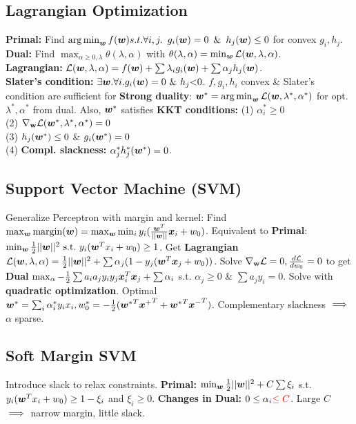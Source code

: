 \subsection*{Lagrangian Optimization}
\textbf{Primal:} Find $\operatorname*{arg\,min}_{\bm{w}} f({\bm{w}})\\s.t. \forall i,j.\,\,\,g_i({\bm{w}})=0\,\,\,\&\,\,\,h_j({\bm{w}}) \leq 0$ for convex $g_i, h_j$.\\
\textbf{Dual:} Find $\max_{\alpha\geq0,\lambda} {\theta(\lambda, \alpha)}$ with ${\theta(\lambda, \alpha)} = \min_{\bm{w}}\mathcal{L}({\bm{w}}, \lambda, \alpha)$.\\
\textbf{Lagrangian:} $\mathcal{L}({\bm{w}}, \mathbf{\lambda}, \mathbf{\alpha}) = f({\bm{w}}) + \sum\lambda_i g_i({\bm{w}}) + \sum\alpha_j h_j({\bm{w}})$.\\
\textbf{Slater's condition:} $\exists {\bm{w}}. \forall i. g_i({\bm{w}})=0\,\,\&\,\,h_j\mathbf{<}0$.
$f, g_i, h_i$ convex \& Slater's condition are sufficient for \textbf{Strong duality}: ${\bm{w}}^* = \operatorname*{arg\,min}_{\bm{w}} \mathcal{L}({\bm{w}}, \lambda^*, \alpha^*)$ for opt. $\lambda^*, \alpha^*$ from dual. Also, ${\bm{w}}^*$ satisfies \textbf{KKT conditions:} (1) $\alpha^*_i \geq 0$\\
(2) $\nabla_{\mathbf{w}}\mathcal{L}({\bm{w}}^*,\lambda^*,\alpha^*)=0$\\
(3) $h_j({\bm{w}}^*) \leq 0$ \& $g_i({\bm{w}}^*) = 0$\\
(4) \textbf{Compl. slackness:} $\alpha^*_jh^*_j({\bm{w}}^*) = 0$.

\subsection*{Support Vector Machine (SVM)}
Generalize Perceptron with margin and kernel:
Find $\max_{\bm{w}} \mathrm{margin}({\bm{w}}) = \max_{\bm{w}}\min_i y_i(\frac{{\bm{w}}^T}{||{\bm{w}}||}{\bm{x}}_i + w_0)$. Equivalent to \textbf{Primal}: $\min_{\bm{w}} \frac{1}{2}||{\bm{w}}||^2\,\,\mathrm{s.t.}\,\, y_i({\bm{w}}^Tx_i+w_0) \geq 1$. Get \textbf{Lagrangian} $\mathcal{L}({\bm{w}}, \lambda, \alpha) = \frac{1}{2}||{\bm{w}}||^2 + \sum\alpha_j (1-y_j({\bm{w}}^T{\bm{x}}_j+w_0))$. Solve $\nabla_{\mathbf{w}}\mathcal{L}=0, \frac{d\mathcal{L}}{dw_0}=0$ to get \textbf{Dual} $\max_\alpha -\frac{1}{2}\sum a_ia_jy_iy_j{\bm{x}}^T_i{\bm{x}}_j + \sum\alpha_i$ s.t.
$\alpha_j\geq 0$ \& $\sum a_jy_i = 0$. Solve with \textbf{quadratic optimization}. Optimal ${\bm{w}}^* = \sum_i \alpha^*_i y_i x_i, w_0^* = -\frac{1}{2}({{\bm{w}}^*}^T{{\bm{x}}^+}^T + {{\bm{w}}^*}^T{{\bm{x}}^-}^T)$. Complementary slackness $\color{black}\implies$ $\alpha$ sparse.
\subsection*{Soft Margin SVM}
Introduce slack to relax constraints.
\textbf{Primal:} $\min_{\bm{w}} \frac{1}{2}||{\bm{w}}||^2 + C\sum\xi_i$ s.t. $y_i({\bm{w}}^Tx_i+w_0) \geq 1-\xi_i$ and $\xi_i \geq 0$.
\textbf{Changes in Dual:} $0\leq\alpha_i{\color{red}\leq C}$.
Large $C$ $\color{black}\implies$ narrow margin, little slack. 

